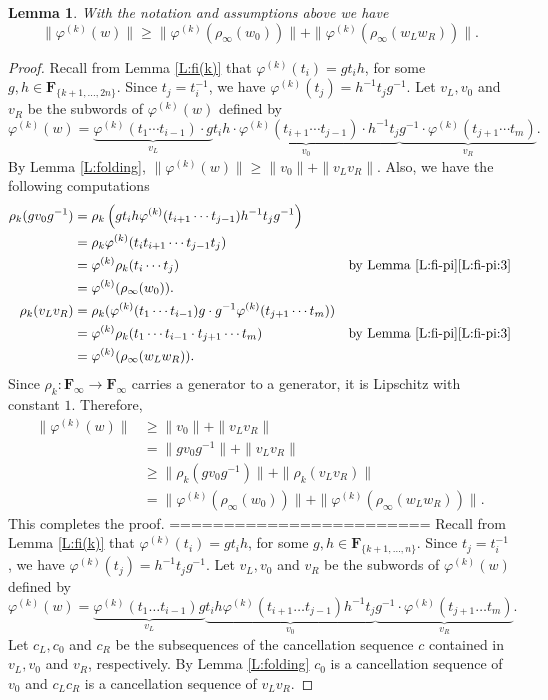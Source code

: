 \documentclass[12pt,reqno,a4paper]{article}
\newtheorem{lemma}[theorem]{Lemma}
\theoremstyle{definition}
\theoremstyle{remark}
\numberwithin{equation}{section}
\numberwithin{figure}{section}
\newcommand{\B}[1]{{\mathbf #1}}
\begin{document}
\begin{lemma}\label{L:fik-anti-triangle}
With the notation and assumptions above we have
$$
\|\varphi^{(k)}(w)\|\geq \|\varphi^{(k)}(\rho_{\infty}(w_0))\| + \|\varphi^{(k)}(\rho_{\infty}(w_Lw_R))\|.
$$
\end{lemma}
\begin{proof}
Recall from Lemma \ref{L:fi(k)} that $\varphi^{(k)}(t_i)=gt_ih$, for some $g,h\in \B F_{\{k+1,\ldots,2n\}}$. 
Since $t_j=t_i^{-1}$, we have
$\varphi^{(k)}(t_j) = h^{-1}t_jg^{-1}$. Let $v_L,v_0$ and $v_R$ be the subwords of $\varphi^{(k)}(w)$ defined by
$$
\varphi^{(k)}(w) =
\underbrace{\varphi^{(k)}(t_1\cdots t_{i-1}) \cdot g}_{v_L}
\underbrace{t_ih \cdot \varphi^{(k)}(t_{i+1}\cdots t_{j-1}) \cdot h^{-1}t_j}_{v_0}
\underbrace{g^{-1}\cdot \varphi^{(k)}(t_{j+1}\cdots t_m)}_{v_R}.
$$
By Lemma \ref{L:folding}, %
$
\|\varphi^{(k)}(w)\| \geq \|v_0\| + \|v_L v_R\|$.
Also, we have the following computations
\begin{align*}
\rho_k(gv_0g^{-1}) 
&=\rho_k\left(gt_ih\varphi^{(k)}(t_{i+1}\cdots t_{j-1})h^{-1}t_jg^{-1}\right)\\
&=\rho_k\varphi^{(k)}(t_it_{i+1}\cdots t_{j-1}t_j)\\
&=\varphi^{(k)}\rho_k(t_i\cdots t_j) &\text{by Lemma \ref{L:fi-pi}\ref{L:fi-pi:3}}\\
&=\varphi^{(k)}(\rho_{\infty}(w_0)).
\\
\rho_k(v_Lv_R)
&=\rho_k(\varphi^{(k)}(t_1\cdots t_{i-1})g\cdot g^{-1}\varphi^{(k)}(t_{j+1}\cdots t_m))\\
&=\varphi^{(k)}\rho_k(t_1\cdots t_{i-1} \cdot t_{j+1}\cdots t_m)  &\text{by Lemma \ref{L:fi-pi}\ref{L:fi-pi:3}} \\
&=\varphi^{(k)}(\rho_{\infty}(w_Lw_R)).
\end{align*}
Since $\rho_k \colon \B F_\infty \to \B F_\infty$ carries a generator to a generator, it is Lipschitz with constant $1$.
Therefore,
\begin{align*}
\| \varphi^{(k)}(w) \| & \geq \| v_0 \| + \| v_L v_R\|
\\
& = 
\| gv_0g^{-1} \| + \| v_L v_R\|
\\
& \geq 
\| \rho_k(gv_0g^{-1}) \| + \| \rho_k(v_L v_R)\|
\\
& =
\| \varphi^{(k)}(\rho_{\infty}(w_0)) \| + \| \varphi^{(k)}(\rho_{\infty}(w_Lw_R))\|.
\end{align*}
This completes the proof.
\iffalse
========================
Recall from Lemma \ref{L:fi(k)} that $\varphi^{(k)}(t_i)=gt_ih$, for some
$g,h\in \B F_{\{k+1,\ldots,n\}}$. Since $t_j=t_i^{-1}$, we have
$\varphi^{(k)}(t_j) = h^{-1}t_jg^{-1}$. Let $v_L,v_0$ and $v_R$ be the subwords of $\varphi^{(k)}(w)$ defined by
$$
\varphi^{(k)}(w) =
\underbrace{\varphi^{(k)}(t_1\dots t_{i-1})g}_{v_L}
\underbrace{t_ih\varphi^{(k)}(t_{i+1}\dots t_{j-1})h^{-1}t_j}_{v_0}
\underbrace{g^{-1}\cdot \varphi^{(k)}(t_{j+1}\dots t_m)}_{v_R}.
$$
Let $c_L,c_0$ and $c_R$ be the subsequences of the cancellation sequence
$c$ contained in $v_L,v_0$ and $v_R$, respectively.
By Lemma \ref{L:folding} $c_0$ is a cancellation sequence of $v_0$
and $c_Lc_R$ is a cancellation sequence of $v_Lv_R$. 


\end{proof}
\end{document}
